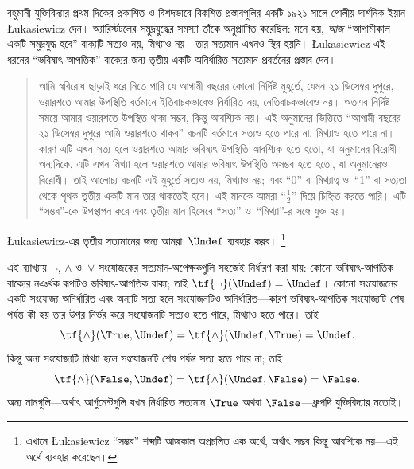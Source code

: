 \documentclass[../../../include/open-logic-section]{subfiles}
\begin{document}


বহুমানী যুক্তিবিদ্যার প্রথম দিকের প্রকাশিত ও বিশদভাবে বিকশিত প্রস্তাবগুলির
একটি ১৯২১ সালে পোলীয় দার্শনিক ইয়ান \L ukasiewicz দেন। অ্যারিস্টটলের
সমুদ্রযুদ্ধের সমস্যা তাঁকে অনুপ্রাণিত করেছিল: মনে হয়,
\emph{আজ} “আগামীকাল একটি সমুদ্রযুদ্ধ হবে” বাক্যটি সত্যও নয়, মিথ্যাও
নয়—তার সত্যমান এখনও স্থির হয়নি। \L ukasiewicz এই ধরনের
“ভবিষ্যৎ-আপতিক” বাক্যের জন্য তৃতীয় একটি অনির্ধারিত সত্যমান প্রবর্তনের
প্রস্তাব দেন।
\begin{quote}
আমি স্ববিরোধ ছাড়াই ধরে নিতে পারি যে আগামী বছরের কোনো নির্দিষ্ট মুহূর্তে,
যেমন ২১ ডিসেম্বর দুপুরে, ওয়ারশতে আমার উপস্থিতি বর্তমানে ইতিবাচকভাবেও
নির্ধারিত নয়, নেতিবাচকভাবেও নয়। অতএব নির্দিষ্ট সময়ে আমার ওয়ারশতে
উপস্থিত থাকা সম্ভব, কিন্তু আবশ্যিক নয়। এই অনুমানের ভিত্তিতে “আগামী বছরের
২১ ডিসেম্বর দুপুরে আমি ওয়ারশতে থাকব” বচনটি বর্তমানে সত্যও হতে পারে না,
মিথ্যাও হতে পারে না। কারণ এটি এখন সত্য হলে ওয়ারশতে আমার ভবিষ্যৎ উপস্থিতি
আবশ্যিক হতে হতো, যা অনুমানের বিরোধী। অন্যদিকে, এটি এখন মিথ্যা হলে ওয়ারশতে
আমার ভবিষ্যৎ উপস্থিতি অসম্ভব হতে হতো, যা অনুমানেরও বিরোধী। তাই আলোচ্য
বচনটি এই মুহূর্তে সত্যও নয়, মিথ্যাও নয়; এবং “0” বা মিথ্যাত্ব ও~“1”
বা সত্যতা থেকে পৃথক তৃতীয় একটি মান তার থাকতেই হবে। এই মানকে আমরা
“$\frac{1}{2}$” দিয়ে চিহ্নিত করতে পারি। এটি “সম্ভব”-কে উপস্থাপন করে এবং
তৃতীয় মান হিসেবে “সত্য” ও~“মিথ্যা”-র সঙ্গে যুক্ত হয়।
\end{quote}
\L ukasiewicz-এর তৃতীয় সত্যমানের জন্য আমরা~$\Undef$ ব্যবহার করব।%
\footnote{এখানে \L ukasiewicz “সম্ভব” শব্দটি আজকাল অপ্রচলিত এক অর্থে,
অর্থাৎ সম্ভব কিন্তু আবশ্যিক নয়—এই অর্থে ব্যবহার করেছেন।}

এই ব্যাখ্যায় $\lnot$, $\land$ ও~$\lor$ সংযোজকের সত্যমান-অপেক্ষকগুলি
সহজেই নির্ধারণ করা যায়: কোনো ভবিষ্যৎ-আপতিক বাক্যের নঞর্থক রূপটিও
ভবিষ্যৎ-আপতিক বাক্য; তাই $\tf{\lnot}(\Undef) = \Undef$। কোনো
সংযোজনের একটি সংযোজ্য অনির্ধারিত এবং অন্যটি সত্য হলে সংযোজনটিও
অনির্ধারিত—কারণ ভবিষ্যৎ-আপতিক সংযোজ্যটি শেষ পর্যন্ত কী হয় তার উপর নির্ভর
করে সংযোজনটি সত্যও হতে পারে, মিথ্যাও হতে পারে। তাই
\[
    \tf{\land}(\True, \Undef) =
\tf{\land}(\Undef, \True) =
\Undef.
\]
কিন্তু অন্য সংযোজ্যটি মিথ্যা হলে সংযোজনটি শেষ পর্যন্ত সত্য হতে পারে না;
তাই
\[\tf{\land}(\False, \Undef) =
\tf{\land}(\Undef, \False) = \False.\]
অন্য মানগুলি—অর্থাৎ আর্গুমেন্টগুলি যখন নির্ধারিত সত্যমান $\True$ অথবা
$\False$—ধ্রুপদি যুক্তিবিদ্যার মতোই।
\end{document}
